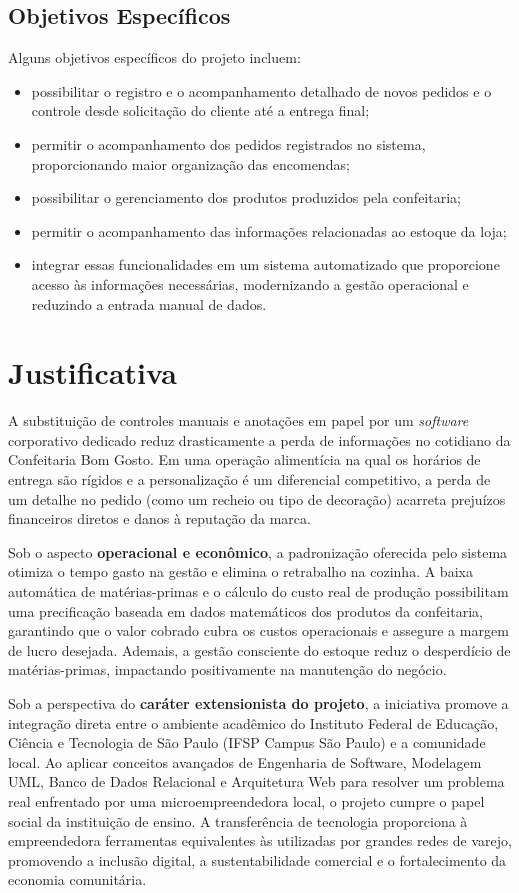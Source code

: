 \subsection{Objetivos Específicos}
Alguns objetivos específicos do projeto incluem:
\begin{itemize}
    \item possibilitar o registro e o acompanhamento detalhado de novos pedidos e o controle desde solicitação do cliente até a entrega final;
    \item permitir o acompanhamento dos pedidos registrados no sistema, proporcionando maior organização das encomendas;
    \item possibilitar o gerenciamento dos produtos produzidos pela confeitaria;
    \item permitir o acompanhamento das informações relacionadas ao estoque da loja;
    \item integrar essas funcionalidades em um sistema automatizado que proporcione acesso às informações necessárias, modernizando a gestão operacional e reduzindo a entrada manual de dados.
\end{itemize}

\section{Justificativa}
A substituição de controles manuais e anotações em papel por um \textit{software} corporativo dedicado reduz drasticamente a perda de informações no cotidiano da Confeitaria Bom Gosto. Em uma operação alimentícia na qual os horários de entrega são rígidos e a personalização é um diferencial competitivo, a perda de um detalhe no pedido (como um recheio ou tipo de decoração) acarreta prejuízos financeiros diretos e danos à reputação da marca.

Sob o aspecto \textbf{operacional e econômico}, a padronização oferecida pelo sistema otimiza o tempo gasto na gestão e elimina o retrabalho na cozinha. A baixa automática de matérias-primas e o cálculo do custo real de produção possibilitam uma precificação baseada em dados matemáticos dos produtos da confeitaria, garantindo que o valor cobrado cubra os custos operacionais e assegure a margem de lucro desejada. Ademais, a gestão consciente do estoque reduz o desperdício de matérias-primas, impactando positivamente na manutenção do negócio.

Sob a perspectiva do \textbf{caráter extensionista do projeto}, a iniciativa promove a integração direta entre o ambiente acadêmico do Instituto Federal de Educação, Ciência e Tecnologia de São Paulo (IFSP Campus São Paulo) e a comunidade local. Ao aplicar conceitos avançados de Engenharia de Software, Modelagem UML, Banco de Dados Relacional e Arquitetura Web para resolver um problema real enfrentado por uma microempreendedora local, o projeto cumpre o papel social da instituição de ensino. A transferência de tecnologia proporciona à empreendedora ferramentas equivalentes às utilizadas por grandes redes de varejo, promovendo a inclusão digital, a sustentabilidade comercial e o fortalecimento da economia comunitária.


